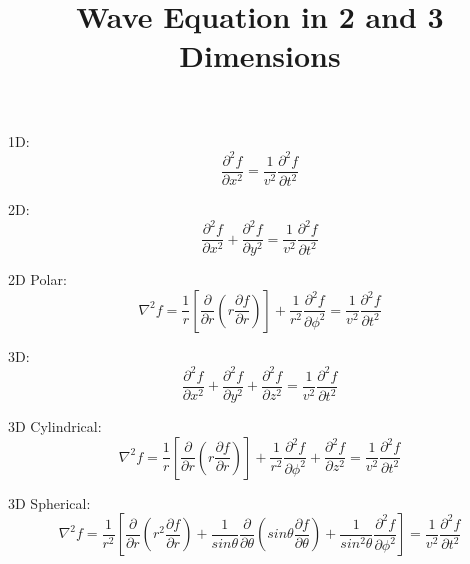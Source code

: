 \documentclass[12pt]{article}
\title{Wave Equation in 2 and 3 Dimensions}
\date{}
\begin{document}
\maketitle




1D:
\[\frac{\partial^2 f}{\partial x^2} = \frac{1}{v^2}\frac{\partial^2 f}{\partial t^2} \]

2D:
\[\frac{\partial^2 f}{\partial x^2} + \frac{\partial^2 f}{\partial y^2} = \frac{1}{v^2}\frac{\partial^2 f}{\partial t^2} \]

2D Polar:
\[ \nabla^2 f = \frac{1}{r}\left[\frac{\partial}{\partial r}\left(r\frac{\partial f}{\partial r}\right)\right] + \frac{1}{r^2}\frac{\partial^2 f}{\partial \phi^2} = \frac{1}{v^2}\frac{\partial^2 f}{\partial t^2} \]

3D:
\[\frac{\partial^2 f}{\partial x^2} + \frac{\partial^2 f}{\partial y^2} + \frac{\partial^2 f}{\partial z^2} = \frac{1}{v^2}\frac{\partial^2 f}{\partial t^2} \]

3D Cylindrical:
\[\nabla^2 f = \frac{1}{r}\left[\frac{\partial}{\partial r}\left(r\frac{\partial f}{\partial r}\right)\right] + \frac{1}{r^2}\frac{\partial^2 f}{\partial \phi^2} + \frac{\partial^2 f}{\partial z^2} = \frac{1}{v^2}\frac{\partial^2 f}{\partial t^2} \]

3D Spherical:
\[\nabla^2 f = \frac{1}{r^2}\left[\frac{\partial}{\partial r}\left(r^2\frac{\partial f}{\partial r}\right) + \frac{1}{sin\theta}\frac{\partial}{\partial \theta}\left( sin\theta \frac{\partial f}{\partial \theta}\right) + \frac{1}{sin^2\theta}\frac{\partial^2 f}{\partial \phi^2} \right] = \frac{1}{v^2}\frac{\partial^2 f}{\partial t^2} \]
\end{document}
